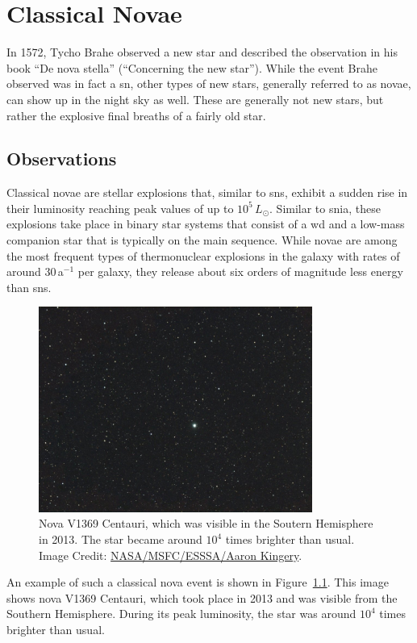 
\chapter{Classical Novae}\label{ch:novae}

In 1572, Tycho Brahe observed a new star and described the observation in his book ``De nova stella'' (``Concerning the new star''). While the event Brahe observed was in fact a \acf{sn}, other types of new stars, generally referred to as novae, can show up in the night sky as well. These are generally not new stars, but rather the explosive final breaths of a fairly old star.

\section{Observations}

Classical novae are stellar explosions that, similar to \acp{sn}, exhibit a sudden rise in their luminosity reaching peak values of up to $10^5\,L_\odot$. Similar to \ac{snia}, these explosions take place in binary star systems that consist of a \acf{wd} and a low-mass companion star that is typically on the main sequence. While novae are among the most frequent types of thermonuclear explosions in the galaxy with rates of around 30\,a$^{-1}$ per galaxy, they release about six orders of magnitude less energy than \acp{sn}.
\begin{figure}[tb]
    \centering
    \includegraphics[width=0.8\textwidth]{graphics/novae/nova_v1369}
    \caption{Nova V1369 Centauri, which was visible in the Soutern Hemisphere in 2013. The star became around $10^4$ times brighter than usual. Image Credit: \href{https://www.nasa.gov/watchtheskies/new-nova-star-australia.html}{NASA/MSFC/ESSSA/Aaron Kingery}.}
    \label{fig:novae:nova_v1369}
\end{figure}
An example of such a classical nova event is shown in Figure~\ref{fig:novae:nova_v1369}. This image shows nova V1369 Centauri, which took place in 2013 and was visible from the Southern Hemisphere. During its peak luminosity, the star was around $10^4$ times brighter than usual. 

